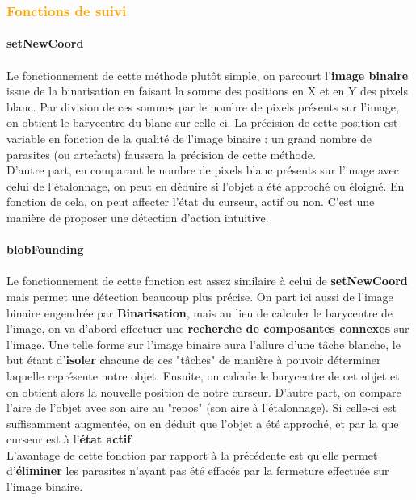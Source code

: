 \documentclass{report}
\begin{document}
					\subsubsection{\textcolor{orange}{Fonctions de suivi}}
						\paragraph{setNewCoord} \paragraph{}
						Le fonctionnement de cette méthode plutôt simple, on parcourt l'\textbf{image binaire} issue de la binarisation en faisant la somme des positions en X et en Y des pixels blanc. Par division de ces sommes par le nombre de pixels présents sur l'image, on obtient le barycentre du blanc sur celle-ci. La précision de cette position est variable en fonction de la qualité de l'image binaire : un grand nombre de parasites (ou artefacts) faussera la précision de cette méthode.\\
						D'autre part, en comparant le nombre de pixels blanc présents sur l'image avec celui de l'étalonnage, on peut en déduire si l'objet a été approché ou éloigné. En fonction de cela, on peut affecter l'état du curseur, actif ou non. C'est une manière de proposer une détection d'action intuitive.
						\paragraph{blobFounding} \paragraph{}
						Le fonctionnement de cette fonction est assez similaire à celui de \textbf{setNewCoord} mais permet une détection beaucoup plus précise. On part ici aussi de l'image binaire engendrée par \textbf{Binarisation}, mais au lieu de calculer le barycentre de l'image, on va d'abord effectuer une  \textbf{recherche de composantes connexes} sur l'image. Une telle forme sur l'image binaire aura l'allure d'une tâche blanche, le but étant d'\textbf{isoler} chacune de ces "tâches" de manière à pouvoir déterminer laquelle représente notre objet. Ensuite, on calcule le barycentre de cet objet et on obtient alors la nouvelle position de notre curseur. D'autre part, on compare l'aire de l'objet avec son aire au "repos" (son aire à l'étalonnage). Si celle-ci est suffisamment augmentée, on en déduit que l'objet a été approché, et par la que curseur est à l'\textbf{état actif}\\
						L'avantage de cette fonction par rapport à la précédente est qu'elle permet d'\textbf{éliminer} les parasites n'ayant pas été effacés par la fermeture effectuée sur l'image binaire.
\end{document}
